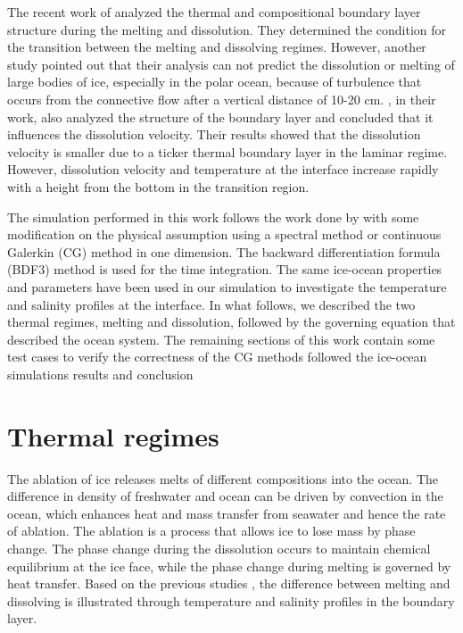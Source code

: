 \documentclass[11pt,a4paper]{article}
\begin{document}
	The recent work of \cite{wells2011melting} analyzed the thermal and compositional boundary layer structure during the melting and dissolution. They determined the condition for the transition between the melting and dissolving regimes. However, another study pointed out that their analysis can not predict the dissolution or melting of large bodies of ice, especially in the polar ocean, because of turbulence that occurs from the connective flow after a vertical distance of 10-20 cm. \cite{gayen2016simulation}, in their work, also analyzed the structure of the boundary layer and concluded that it influences the dissolution velocity. Their results showed that the dissolution velocity is smaller due to a ticker thermal boundary layer in the laminar regime. However, dissolution velocity and temperature at the interface increase rapidly with a height from the bottom in the transition region.
    
    
    The simulation performed in this work follows the work done by \cite{gayen2016simulation} with some modification on the physical assumption using a spectral method or continuous Galerkin (CG) method in one dimension. The backward differentiation formula (BDF3) method is used for the time integration. The same ice-ocean properties and parameters have been used in our simulation to investigate the temperature and salinity profiles at the interface. In what follows, we described the two thermal regimes, melting and dissolution, followed by the governing equation that described the ocean system. The remaining sections of this work contain some test cases to verify the correctness of the CG methods followed the ice-ocean simulations results and conclusion
	
	
	\section{Thermal regimes}
	
	The ablation of ice releases melts of different compositions into the ocean. The difference in density of freshwater and ocean can be driven by convection in the ocean, which enhances heat and mass transfer from seawater and hence the rate of ablation. The ablation is a process that allows ice to lose mass by phase change. The phase change during the dissolution occurs to maintain chemical equilibrium at the ice face, while the phase change during melting is governed by heat transfer. Based on the previous studies \citep{wells2011melting, kerr2015dissolution}, the difference between melting and dissolving is illustrated through temperature and salinity profiles in the boundary layer.
	
\end{document}
